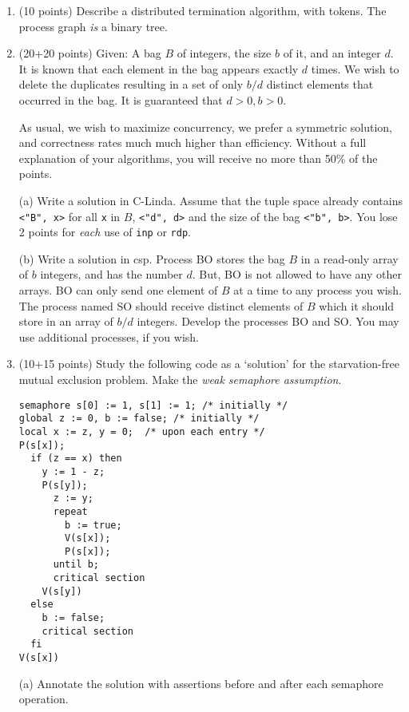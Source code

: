 \documentclass[12pt]{article}
\def\CSP{{\sc csp}}
\begin{document}
\begin{enumerate}
\begin{enumerate}
\end{enumerate}

\item (10 points)
Describe a distributed termination algorithm, with tokens.
The process graph {\em is} a binary tree.

\item (20+20 points) Given: A bag $B$ of integers, the size $b$ of it,
and an integer $d$.  It is known that each element in the bag appears
exactly $d$ times.  We wish to delete the duplicates resulting in a
set of only $b/d$ distinct elements that occurred in the bag.  It is
guaranteed that $d > 0, b > 0$.


As usual, we wish to maximize concurrency, we prefer a symmetric
solution, and correctness rates much much higher than efficiency.
Without a full explanation of your algorithms, you will receive no
more than 50\% of the points.

(a) Write a solution in C-Linda.  Assume that the tuple space already
contains {\tt <"B", x>} for all {\tt x} in $B$, {\tt <"d", d>} and the
size of the bag {\tt <"b", b>}.  You lose 2 points for {\em each} use
of {\tt inp} or {\tt rdp}.

(b) Write a solution in \CSP.  Process BO stores the bag $B$ in a
read-only array of $b$ integers, and has the number $d$.  But, BO is
not allowed to have any other arrays.  BO can only send one element of
$B$ at a time to any process you wish.  The process named SO should
receive distinct elements of $B$ which it should store in an array of
$b/d$ integers.  Develop the processes BO and SO.  You may use
additional processes, if you wish.

\item (10+15 points) Study the following code as a `solution' for the
starvation-free mutual exclusion problem.  Make the {\em weak
semaphore assumption}.\\

\begin{minipage}{2in}
\begin{verbatim}
semaphore s[0] := 1, s[1] := 1; /* initially */
global z := 0, b := false; /* initially */ 
local x := z, y = 0;  /* upon each entry */
P(s[x]);
  if (z == x) then
    y := 1 - z;
    P(s[y]);
      z := y;
      repeat
        b := true;
        V(s[x]);
        P(s[x]);
      until b;
      critical section
    V(s[y])
  else
    b := false;
    critical section
  fi
V(s[x])
\end{verbatim}
\end{minipage}
\quad
\begin{minipage}{2.75in}
(a) Annotate the solution with assertions
before and after each semaphore operation.\\


\end{minipage}
\end{enumerate}
\end{document}
